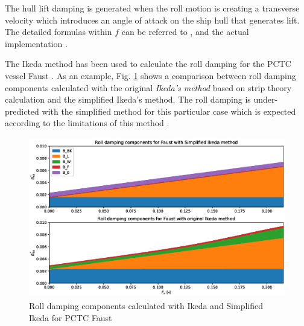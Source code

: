 The hull lift damping is generated when the roll motion is creating a transverse velocity which introduces an angle of attack on the ship hull that generates lift.     
The detailed formulas within $f$ can be referred to \parencite{kawahara_simple_2011}, \parencite{ikeda_velocity_1979} and the actual implementation \parencite{alexandersson_martinlarsalbertrolldecay-estimators_2020}.




The Ikeda method has been used to calculate the roll damping for the PCTC vessel Faust \parencite{soder_assessment_2019}. As an example, Fig. \ref{fig:ikeda_vs_simplified} shows a comparison between roll damping components calculated with the original \emph{Ikeda's method} based on strip theory calculation and the simplified Ikeda's method. The roll damping is under-predicted with the simplified method for this particular case which is expected according to the limitations of this method  \parencite{kawahara_simple_2011}.

\begin{figure}[H]
    \centering
    \includegraphics[height=7cm, width=14cm]{figures/ikeda_vs_simplified.eps}
    \caption{Roll damping components calculated with Ikeda and Simplified Ikeda for PCTC Faust}
    \label{fig:ikeda_vs_simplified}
\end{figure}


